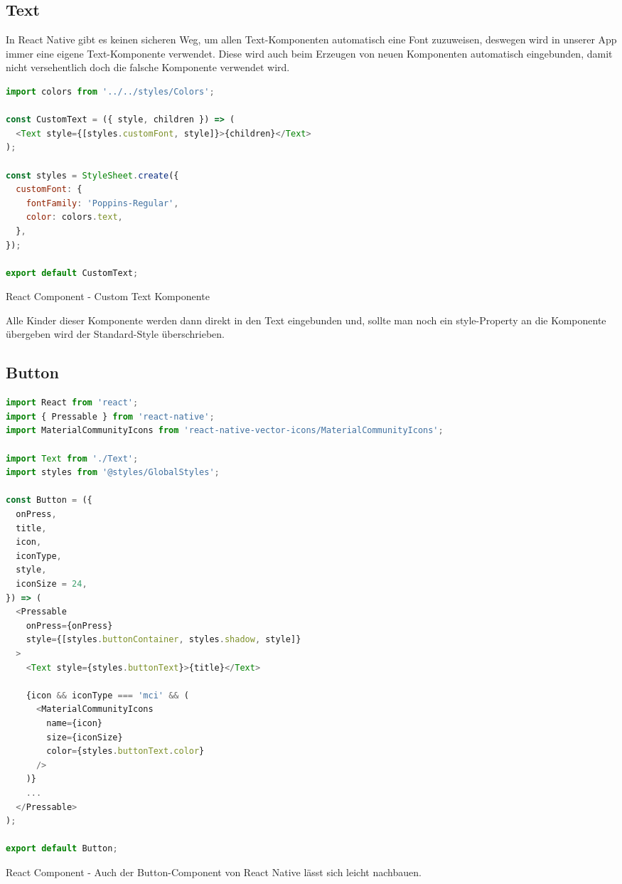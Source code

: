 \newpage
\subsection{Text}
In React Native gibt es keinen sicheren Weg, um allen Text-Komponenten automatisch eine Font
zuzuweisen, deswegen wird in unserer App immer eine eigene Text-Komponente verwendet. Diese wird
auch beim Erzeugen von neuen Komponenten automatisch eingebunden, damit nicht versehentlich doch die
falsche Komponente verwendet wird.

\begin{code}[htp]
\begin{lstlisting}[firstnumber=1,language=JavaScript, style=JSX]
import colors from '../../styles/Colors';

const CustomText = ({ style, children }) => (
  <Text style={[styles.customFont, style]}>{children}</Text>
);

const styles = StyleSheet.create({
  customFont: {
    fontFamily: 'Poppins-Regular',
    color: colors.text,
  },
});

export default CustomText;
\end{lstlisting}
\caption{React Component - Custom Text Komponente}
\end{code}

Alle Kinder dieser Komponente werden dann direkt in den Text eingebunden und, sollte man noch ein
style-Property an die Komponente übergeben wird der Standard-Style überschrieben.

\newpage
\subsection{Button}
\begin{code}[htp]
\begin{lstlisting}[firstnumber=1,language=JavaScript, style=JSX]
import React from 'react';
import { Pressable } from 'react-native';
import MaterialCommunityIcons from 'react-native-vector-icons/MaterialCommunityIcons';

import Text from './Text';
import styles from '@styles/GlobalStyles';

const Button = ({
  onPress,
  title,
  icon,
  iconType,
  style,
  iconSize = 24,
}) => (
  <Pressable
    onPress={onPress}
    style={[styles.buttonContainer, styles.shadow, style]}
  >
    <Text style={styles.buttonText}>{title}</Text>

    {icon && iconType === 'mci' && (
      <MaterialCommunityIcons
        name={icon}
        size={iconSize}
        color={styles.buttonText.color}
      />
    )}
    ...
  </Pressable>
);

export default Button;

\end{lstlisting}
\caption{React Component - Auch der Button-Component von React Native lässt sich leicht nachbauen.}
\end{code}

